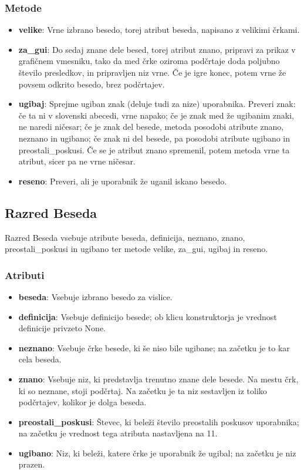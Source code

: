 \documentclass [a4paper, 12pt] {article}
\begin{document}
\subsubsection {Metode}
\begin {itemize}
\item \textbf {velike}: Vrne izbrano besedo, torej atribut beseda, napisano z velikimi črkami.
\item \textbf {za\_gui}: Do sedaj znane dele besed, torej atribut znano, pripravi za prikaz v grafičnem vmesniku, tako da med črke oziroma podčrtaje doda poljubno število presledkov, in pripravljen niz vrne. Če je igre konec, potem vrne že povsem odkrito besedo, brez podčrtajev. 
\item \textbf{ugibaj}: Sprejme ugiban znak (deluje tudi za nize) uporabnika. Preveri znak: če ta ni v slovenski abecedi, vrne napako; če je znak med že ugibanim znaki, ne naredi ničesar; če je znak del besede, metoda posodobi atribute znano, neznano in ugibano; če znak ni del besede, pa posodobi atribute ugibano in preostali\_poskusi. Če se je atribut znano spremenil, potem metoda vrne ta atribut, sicer pa ne vrne ničesar. 
\item \textbf{reseno}: Preveri, ali je uporabnik že uganil iskano besedo.
\end {itemize}

\subsection {Razred Beseda}
Razred Beseda vsebuje atribute beseda, definicija, neznano, znano, preostali\_poskusi in ugibano ter metode velike, za\_gui, ugibaj in reseno.
\subsubsection {Atributi}
\begin {itemize}
\item \textbf {beseda}: Vsebuje izbrano besedo za vislice.
\item \textbf {definicija}: Vsebuje definicijo besede; ob klicu konstruktorja je vrednost definicije privzeto None.
\item \textbf {neznano}: Vsebuje črke besede, ki še niso bile ugibane; na začetku je to kar cela beseda. 
\item \textbf {znano}: Vsebuje niz, ki predstavlja trenutno znane dele besede. Na mestu črk, ki so neznane, stoji podčrtaj. Na začetku je ta niz sestavljen iz toliko podčrtajev, kolikor je dolga beseda.
\item \textbf {preostali\_poskusi}: Števec, ki beleži število preostalih poskusov uporabnika; na začetku je vrednost tega atributa nastavljena na 11. 
\item \textbf {ugibano}: Niz, ki beleži, katere črke je uporabnik že ugibal; na začetku je niz prazen.
\end {itemize}
\end{document}
